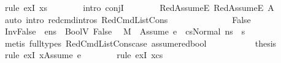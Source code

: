 \begin{isabellebody}
\ {\isacharparenleft}{\kern0pt}rule\ exI{\isacharbrackleft}{\kern0pt}\ {\isacharquery}{\kern0pt}x{\isacharequal}{\kern0pt}s{\isacharprime}{\kern0pt}{\isacharprime}{\kern0pt}{\isacharbrackright}{\kern0pt}{\isacharparenright}{\kern0pt}\isanewline
\ \ \ \ \ \ \isamarkupfalse%
\ {\isacharparenleft}{\kern0pt}intro\ conjI{\isacharparenright}{\kern0pt}\isanewline
\ \ \ \ \ \ \isamarkupfalse%
\ RedAssumeE\ RedAssumeE{}\ A\isanewline
\ \ \ \ \ \ \isamarkupfalse%
\ {\isacharparenleft}{\kern0pt}auto\ intro{\isacharcolon}{\kern0pt}\ red{\isacharunderscore}{\kern0pt}cmd{\isachardot}{\kern0pt}intros\ RedCmdListCons{\isacharparenright}{\kern0pt}\ \ \ \ \ \ \isanewline
\ \ \isamarkupfalse%
\isanewline
\ \ \ \ \isamarkupfalse%
\ False\isanewline
\ \ \ \ \isamarkupfalse%
\ InvFalse{\isacharcolon}{\kern0pt}{\isachardoublequoteopen}{\isasymLambda}{\isacharcomma}{\kern0pt}{\isasymGamma}{\isacharcomma}{\kern0pt}{\isasymOmega}\ {\isasymturnstile}\ {\isasymlangle}e{\isacharcomma}{\kern0pt}ns{}{\isasymrangle}\ {\isasymDown}\ BoolV\ False{\isachardoublequoteclose}\ \isamarkupfalse%
\ {\isacartoucheopen}M{\isacharcomma}{\kern0pt}{\isasymLambda}{\isacharcomma}{\kern0pt}{\isasymGamma}{\isacharcomma}{\kern0pt}{\isasymOmega}\ {\isasymturnstile}\ {\isasymlangle}Assume\ e\ {\isacharhash}{\kern0pt}\ cs{}{\isacharcomma}{\kern0pt}Normal\ ns{}{\isasymrangle}\ {\isacharbrackleft}{\kern0pt}{\isasymrightarrow}{\isacharbrackright}{\kern0pt}\ s{\isacharprime}{\kern0pt}{\isacartoucheclose}\isanewline
\ \ \ \ \ \ \isamarkupfalse%
\ {\isacharparenleft}{\kern0pt}metis\ {\isacharparenleft}{\kern0pt}full{\isacharunderscore}{\kern0pt}types{\isacharparenright}{\kern0pt}\ RedCmdListCons{\isacharunderscore}{\kern0pt}case\ assume{\isacharunderscore}{\kern0pt}red{\isacharunderscore}{\kern0pt}bool{\isacharparenright}{\kern0pt}\ \ \ \ \ \isanewline
\ \ \ \ \isamarkupfalse%
\ {\isacharquery}{\kern0pt}thesis\isanewline
\ \ \ \ \ \ \isamarkupfalse%
\ {\isacharparenleft}{\kern0pt}rule\ exI{\isacharbrackleft}{\kern0pt}\ {\isacharquery}{\kern0pt}x{\isacharequal}{\kern0pt}{\isachardoublequoteopen}{\isacharbrackleft}{\kern0pt}Assume\ e{\isacharbrackright}{\kern0pt}{\isachardoublequoteclose}{\isacharbrackright}{\kern0pt}{\isacharparenright}{\kern0pt}\isanewline
\ \ \ \ \ \ \isamarkupfalse%
\ {\isacharparenleft}{\kern0pt}rule\ exI{\isacharbrackleft}{\kern0pt}\ {\isacharquery}{\kern0pt}x{\isacharequal}{\kern0pt}cs{}{\isacharbrackright}{\kern0pt}{\isacharparenright}{\kern0pt}\isanewline

\end{isabellebody}
